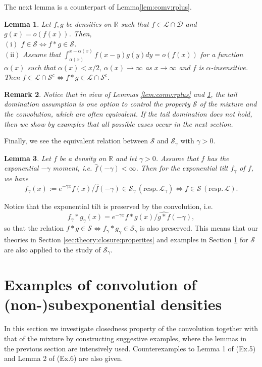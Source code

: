 \documentclass[12pt,leqno]{amsart}
\newtheorem{lemma}{Lemma}[section]
\newtheorem{remark}[lemma]{Remark}
\newcommand{\R}{\mathbb{R}}
\newcommand{\wh}{\widehat}
\newcommand{\cals}{{\mathcal S}}
\newcommand{\call}{{\mathcal L}}
\newcommand{\cald}{{\mathcal D}}
\newcommand{\1}{{\mathbf 1}}
\begin{document}
The next lemma is a counterpart of Lemma\ref{lem:comv:rplus}. 
\begin{lemma}
\label{lem:comv:two-sided}
Let $f,g$ be densities on $\R$ such that $f\in \call\cap \cald$ and $g(x)=o(f(x))$. Then,\\
$(\mathrm{i})$ $f\in\cals \Leftrightarrow f\ast g \in \cals$. \\ 
$(\mathrm{ii})$ 
Assume that $\int_{\alpha(x)}^{x-\alpha(x)}f(x-y)g(y)dy=o(f(x))$ 
for a function $\alpha(x)$ such that $\alpha(x)<x/2,\,\alpha(x)\to \infty$ as $x\to\infty$ and 
$f$ is $\alpha$-insensitive. %
Then $f\in \call \cap \cals^c \Leftrightarrow f\ast g \in \call\cap \cals^c$. 
\end{lemma}
\begin{remark}
Notice that in view of Lemmas \ref{lem:comv:rplus} and \ref{lem:comv:two-sided}, 
the tail domination assumption is one option to control the property $\cals$ of the mixture and the convolution, 
 which are often equivalent. If the tail domination does not hold, then we show by examples that 
all possible cases occur in the next section.  
\end{remark}
Finally, we see the equivalent relation between $\cals$ and $\cals_\gamma$ with $\gamma>0$.  
\begin{lemma}
\label{lem:exp:tilt}
 Let $f$ be a density on $\R$ and let $\gamma>0$. 
Assume that $f$ has the exponential $-\gamma$ moment, i.e. $\wh f(-\gamma)<\infty$. 
Then for the exponential tilt $f_\gamma$ of $f$, we have 
\[
 f_\gamma(x):= e^{-\gamma x} f(x)/ \wh f(-\gamma) \in \cals_\gamma \,(\text{resp.}\, \call_\gamma) 
\Leftrightarrow f \in \cals\, (\text{resp}.\, \call).  
\]
\end{lemma}
Notice that the exponential tilt is preserved by the convolution, i.e. 
\[
 f_\gamma\ast g_\gamma (x)= e^{-\gamma x} f\ast g(x)/\wh {g\ast f} (-\gamma), 
\]
so that the relation $f\ast g \in \cals \Leftrightarrow f_\gamma \ast g_\gamma \in \cals_\gamma$ is also preserved. 
This means that our theories in Section \ref{sec:theory:closure:properites} and examples in Section \ref{sec:examples} for $\cals$ are also 
applied to the study of $\cals_\gamma$. 

\section{Examples of convolution of (non-)subexponential densities}
\label{sec:examples}
In this section we investigate closedness property of the convolution together with that of the mixture
by constructing suggestive examples, where the lemmas in the previous section are intensively used. 
Counterexamples to Lemma 1 of \cite{Kluppelberg:Villasenor:1991} (Ex.5) and Lemma 2 of \cite{Kluppelberg:Villasenor:1991} 
(Ex.6) are also given.
\end{document}
